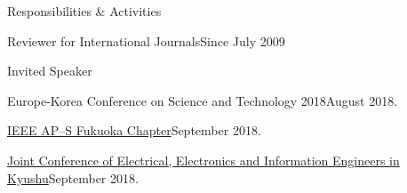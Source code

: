\documentclass{resume} %
\begin{document}
\begin{rSection}{Responsibilities \& Activities}
\begin{rSubsection}{Reviewer for International Journals}{Since July 2009}{}{}
\end{rSubsection}
	

\begin{rSubsection}{Invited Speaker}{}{}{}
\item Europe-Korea Conference on Science and Technology 2018\hfill August 2018.
\item \href{http://ewh.ieee.org/r10/fukuoka/aps/index.html}{IEEE AP--S Fukuoka Chapter}\hfill September 2018.
\item \href{http://www.jceee-kyushu.jp/asia_session}{ Joint Conference of Electrical, Electronics and Information Engineers in Kyushu}\hfill September 2018.
\end{rSubsection}


\end{rSection}
\end{document}
